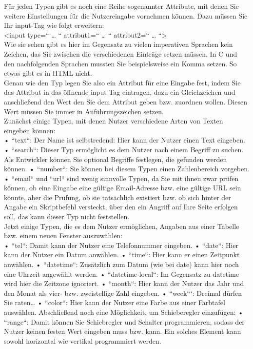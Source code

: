 Für jeden Typen gibt es noch eine Reihe sogenannter Attribute, mit denen Sie weitere Einstellungen für die Nutzereingabe vornehmen können. Dazu müssen Sie Ihr input-Tag wie folgt erweitern:\\

<input type=`` … `` attribut1=`` … `` attribut2=`` … ``>\\

Wie sie sehen gibt es hier im Gegensatz zu vielen imperativen Sprachen kein Zeichen, das Sie zwischen die verschiedenen Einträge setzen müssen. In C und den nachfolgenden Sprachen mussten Sie beispielsweise ein Komma setzen. So etwas gibt es in HTML nicht.\\

Genau wie den Typ legen Sie also ein Attribut für eine Eingabe fest, indem Sie das Attribut in das öffnende input-Tag eintragen, dazu ein Gleichzeichen und anschließend den Wert den Sie dem Attribut geben bzw. zuordnen wollen. Diesen Wert müssen Sie immer in Anführungszeichen setzen.\\

Zunächst einige Typen, mit denen Nutzer verschiedene Arten von Texten eingeben können:\\

•	``text``: Der Name ist selbstredend: Hier kann der Nutzer einen Text eingeben.
•	``search``: Dieser Typ ermöglicht es dem Nutzer nach einem Begriff zu suchen. Als Entwickler können Sie optional Begriffe festlegen, die gefunden werden können.
•	``number``: Sie können bei diesem Typen einen Zahlenbereich vorgeben.
•	``email`` und ``url`` sind wenig sinnvolle Typen, da Sie mit ihnen zwar prüfen können, ob eine Eingabe eine gültige Email-Adresse bzw. eine gültige URL sein könnte, aber die Prüfung, ob sie tatsächlich existiert bzw. ob sich hinter der Angabe ein Skriptbefehl versteckt, über den ein Angriff auf Ihre Seite erfolgen soll, das kann dieser Typ nicht feststellen.\\

Jetzt einige Typen, die es dem Nutzer ermöglichen, Angaben aus einer Tabelle bzw. einem neuen Fenster auszuwählen:\\

•	``tel``: Damit kann der Nutzer eine Telefonnummer eingeben.
•	``date``: Hier kann der Nutzer ein Datum anwählen.
•	``time``: Hier kann er einen Zeitpunkt anwählen.
•	``datetime``: Zusätzlich zum Datum (wie bei date) kann hier noch eine Uhrzeit angewählt werden.
•	``datetime-local``: Im Gegensatz zu datetime wird hier die Zeitzone ignoriert.
•	``month``: Hier kann der Nutzer das Jahr und den Monat als vier- bzw. zweistellige Zahl eingeben.
•	``week```: Dreimal dürfen Sie raten…
•	``color``: Hier kann der Nutzer eine Farbe aus einer Farbtafel auswählen.
Abschließend noch eine Möglichkeit, um Schieberegler einzufügen:
•	``range``: Damit können Sie Schiebregler und Schalter programmieren, sodass der Nutzer keinen festen Wert eingeben muss bzw. kann. Ein solches Element kann sowohl horizontal wie vertikal programmiert werden.\\

